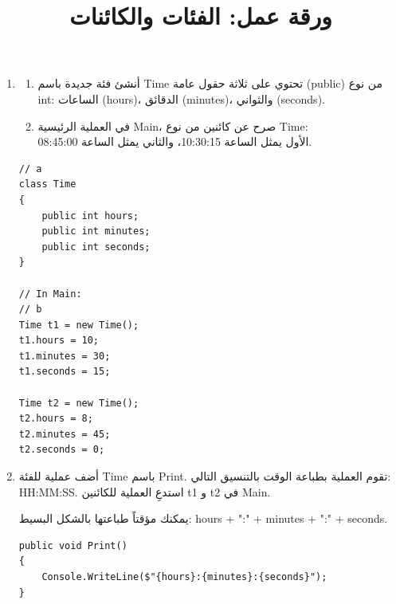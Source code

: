 \documentclass[14pt]{extarticle}
\title{ورقة عمل: الفئات والكائنات}
\begin{document}
\maketitle
\thispagestyle{fancy}

\begin{enumerate}[itemsep=2em]
    \item
    \begin{enumerate}
        \item أنشئ فئة جديدة باسم \textenglish{Time} تحتوي على ثلاثة حقول عامة (\textenglish{public}) من نوع \textenglish{int}: الساعات (\textenglish{hours})، الدقائق (\textenglish{minutes})، والثواني (\textenglish{seconds}).
        \item في العملية الرئيسية \textenglish{Main}، صرح عن كائنين من نوع \textenglish{Time}: \\
         الأول يمثل الساعة 10:30:15، والثاني يمثل الساعة 08:45:00.
    \end{enumerate}

    \ifwithsols
    \begin{boxSolution}
    \begin{english}
    \begin{verbatim}
// a
class Time
{
    public int hours;
    public int minutes;
    public int seconds;
}

// In Main:
// b
Time t1 = new Time();
t1.hours = 10;
t1.minutes = 30;
t1.seconds = 15;

Time t2 = new Time();
t2.hours = 8;
t2.minutes = 45;
t2.seconds = 0;
    \end{verbatim}
    \end{english}
    \end{boxSolution}
    \clearpage
    \fi

    \item
    أضف عملية للفئة \textenglish{Time} باسم \textenglish{Print}. تقوم العملية بطباعة الوقت بالتنسيق التالي: \\
     \textenglish{HH:MM:SS}.
    استدعِ العملية للكائنين \textenglish{t1} و \textenglish{t2} في \textenglish{Main}.
    \begin{boxHint}
    يمكنك مؤقتاً طباعتها بالشكل البسيط: \textenglish{hours + ":" + minutes + ":" + seconds}.
    \end{boxHint}

    \ifwithsols
    \begin{boxSolution}
    \begin{english}
    \begin{verbatim}
public void Print()
{
    Console.WriteLine($"{hours}:{minutes}:{seconds}");
}


\end{verbatim}
\end{english}
\end{boxSolution}
\end{enumerate}
\end{document}
